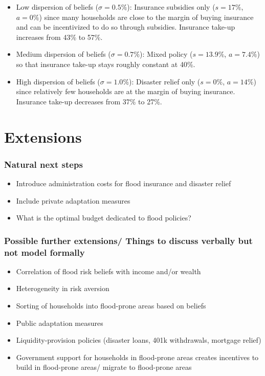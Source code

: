 \documentclass[12pt]{article}
\begin{document}
\begin{itemize}
    \item {Low dispersion of beliefs} ($\sigma = 0.5\%$): Insurance subsidies only ($s = 17\%$, $a = 0\%$) since many households are close to the margin of buying insurance and can be incentivized to do so through subsidies. Insurance take-up increases from 43\% to 57\%.
    \item {Medium dispersion of beliefs} ($\sigma = 0.7\%$): Mixed policy ($s = 13.9\%$, $a = 7.4\%$) so that insurance take-up stays roughly constant at 40\%.
    \item {High dispersion of beliefs} ($\sigma = 1.0\%$): Disaster relief only ($s = 0\%$, $a = 14\%$) since relatively few households are at the margin of buying insurance. Insurance take-up decreases from 37\% to 27\%.
\end{itemize}

\section{Extensions}
\subsubsection*{Natural next steps}
\begin{itemize}
    \item Introduce administration costs for flood insurance and disaster relief
    \item Include private adaptation measures
    \item What is the optimal budget dedicated to flood policies?
\end{itemize}
\subsubsection*{Possible further extensions/ Things to discuss verbally but not model formally}
\begin{itemize}
    \item Correlation of flood risk beliefs with income and/or wealth
    \item Heterogeneity in risk aversion
    \item Sorting of households into flood-prone areas based on beliefs
    \item Public adaptation measures
    \item Liquidity-provision policies (disaster loans, 401k withdrawals, mortgage relief)
    \item Government support for households in flood-prone areas creates incentives to build in flood-prone areas/ migrate to flood-prone areas
\end{itemize}
\end{document}
